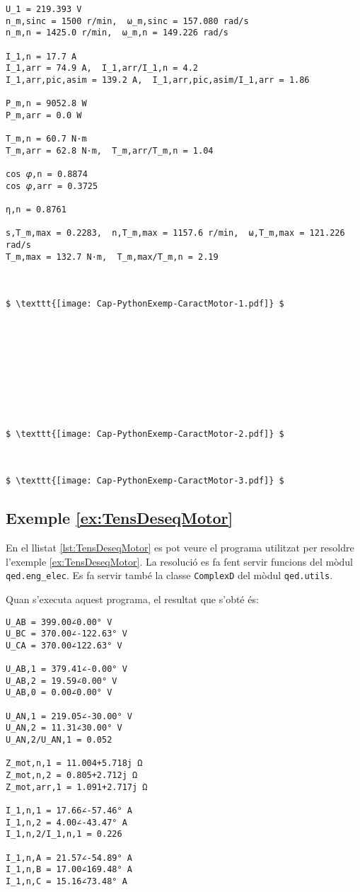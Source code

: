 \begin{lstlisting}[mathescape=true]
U_1 = 219.393 V
n_m,sinc = 1500 r/min,  ω_m,sinc = 157.080 rad/s
n_m,n = 1425.0 r/min,  ω_m,n = 149.226 rad/s

I_1,n = 17.7 A
I_1,arr = 74.9 A,  I_1,arr/I_1,n = 4.2
I_1,arr,pic,asim = 139.2 A,  I_1,arr,pic,asim/I_1,arr = 1.86

P_m,n = 9052.8 W
P_m,arr = 0.0 W

T_m,n = 60.7 N·m
T_m,arr = 62.8 N·m,  T_m,arr/T_m,n = 1.04

cos 𝜑,n = 0.8874
cos 𝜑,arr = 0.3725

η,n = 0.8761

s,T_m,max = 0.2283,  n,T_m,max = 1157.6 r/min,  ω,T_m,max = 121.226 rad/s
T_m,max = 132.7 N·m,  T_m,max/T_m,n = 2.19



$ \texttt{[image: Cap-PythonExemp-CaractMotor-1.pdf]} $
    
    
    
    
    
    
    
    
    
    
$ \texttt{[image: Cap-PythonExemp-CaractMotor-2.pdf]} $



$ \texttt{[image: Cap-PythonExemp-CaractMotor-3.pdf]} $
\end{lstlisting} 






\hypertarget{exemple:TensDeseqMotor}{\subsection{Exemple \ref*{ex:TensDeseqMotor} \TensDeseqMotor}}
En el llistat \vref{lst:TensDeseqMotor} es pot veure el programa utilitzat per resoldre l'exemple \vref{ex:TensDeseqMotor}. La resolució es fa fent servir funcions del mòdul \texttt{qed.eng\_elec}. Es fa servir també la classe \texttt{ComplexD} del mòdul \texttt{qed.utils}.


Quan s'executa aquest programa, el resultat que s'obté és:
\lstset{
	language=,
	numbers=none,
	frame=none
}
\begin{lstlisting}
U_AB = 399.00∠0.00° V
U_BC = 370.00∠-122.63° V
U_CA = 370.00∠122.63° V

U_AB,1 = 379.41∠-0.00° V
U_AB,2 = 19.59∠0.00° V
U_AB,0 = 0.00∠0.00° V

U_AN,1 = 219.05∠-30.00° V
U_AN,2 = 11.31∠30.00° V
U_AN,2/U_AN,1 = 0.052

Z_mot,n,1 = 11.004+5.718j Ω
Z_mot,n,2 = 0.805+2.712j Ω
Z_mot,arr,1 = 1.091+2.717j Ω

I_1,n,1 = 17.66∠-57.46° A
I_1,n,2 = 4.00∠-43.47° A
I_1,n,2/I_1,n,1 = 0.226

I_1,n,A = 21.57∠-54.89° A
I_1,n,B = 17.00∠169.48° A
I_1,n,C = 15.16∠73.48° A
\end{lstlisting} 


